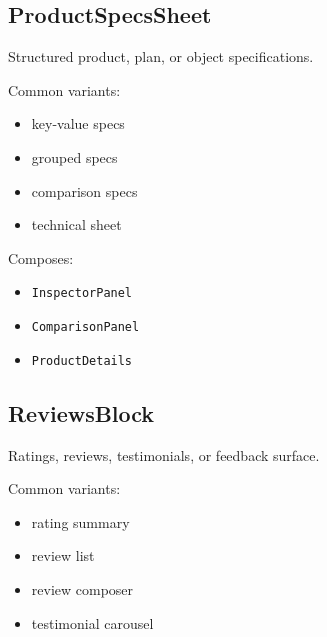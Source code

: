 \subsection{ProductSpecsSheet}\label{record-128-productspecssheet}

Structured product, plan, or object specifications.

Common variants:

\begin{itemize}
\tightlist
\item
  key-value specs
\item
  grouped specs
\item
  comparison specs
\item
  technical sheet
\end{itemize}

Composes:

\begin{itemize}
\tightlist
\item
  \texttt{I\allowbreak{}n\allowbreak{}s\allowbreak{}p\allowbreak{}e\allowbreak{}c\allowbreak{}t\allowbreak{}o\allowbreak{}r\allowbreak{}P\allowbreak{}a\allowbreak{}n\allowbreak{}e\allowbreak{}l}
\item
  \texttt{C\allowbreak{}o\allowbreak{}m\allowbreak{}p\allowbreak{}a\allowbreak{}r\allowbreak{}i\allowbreak{}s\allowbreak{}o\allowbreak{}n\allowbreak{}P\allowbreak{}a\allowbreak{}n\allowbreak{}e\allowbreak{}l}
\item
  \texttt{P\allowbreak{}r\allowbreak{}o\allowbreak{}d\allowbreak{}u\allowbreak{}c\allowbreak{}t\allowbreak{}D\allowbreak{}e\allowbreak{}t\allowbreak{}a\allowbreak{}i\allowbreak{}l\allowbreak{}s}
\end{itemize}

\subsection{ReviewsBlock}\label{record-128-reviewsblock}

Ratings, reviews, testimonials, or feedback surface.

Common variants:

\begin{itemize}
\tightlist
\item
  rating summary
\item
  review list
\item
  review composer
\item
  testimonial carousel
\end{itemize}

